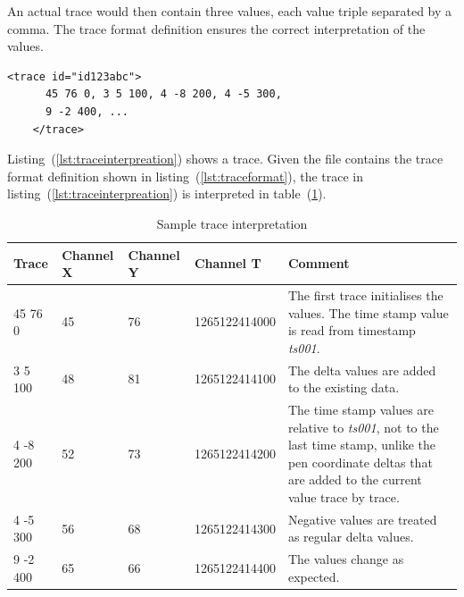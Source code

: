 An actual trace would then contain three values, each value triple separated by
a comma. The trace format definition ensures the correct interpretation of the 
values.
\begin{xmlcode}
  \begin{lstlisting}[emph={trace,channel},
                     emphstyle=\color{blue}\textbf,
                     emph={[2]name,type,units,respectTo,id},
                     emphstyle={[2]\color{red}},
                     caption={A sample trace},
                     label=lst:traceinterpreation]
    <trace id="id123abc">
      45 76 0, 3 5 100, 4 -8 200, 4 -5 300,
      9 -2 400, ...
    </trace>
  \end{lstlisting}
\end{xmlcode}
Listing~(\ref{lst:traceinterpreation}) shows a trace. Given the file contains
the trace format definition shown in listing~(\ref{lst:traceformat}), the trace 
in listing~(\ref{lst:traceinterpreation}) is interpreted in 
table~(\ref{table:sampletraceinterpretation}). 

\begin{table}[htbp]
  \begin{tabular}{|l||l|l|l|p{200pt}|}
    \hline
    Trace & Channel X & Channel Y & Channel T & Comment \\
    \hline
    45 76 0 & 45 & 76  & 1265122414000 & The first trace initialises 
                                         the values. The time stamp value is
                                         read from timestamp \emph{ts001}. \\
    \hline
    3 5 100 & 48 & 81 &  1265122414100 & The delta values are added to the
                                         existing data. \\
    \hline
    4 -8 200 & 52 & 73 &  1265122414200 & The time stamp values are relative to
                                          \emph{ts001}, not to the last time 
                                          stamp, unlike the pen coordinate 
                                          deltas that are added to the current 
                                          value trace by trace. \\
    \hline
    4 -5 300 & 56 & 68 &  1265122414300 & Negative values are treated as regular
                                          delta values. \\
    \hline
    9 -2 400 & 65 & 66 &  1265122414400 & The values change as expected. \\
    \hline
  \end{tabular}
\caption{Sample trace interpretation}
\label{table:sampletraceinterpretation}
\end{table}

